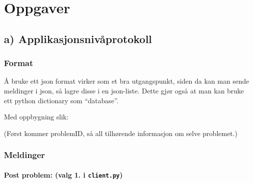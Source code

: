 \section{Oppgaver}\label{oppgaver}

\subsection{a)
Applikasjonsnivåprotokoll}\label{a-applikasjonsnivuxe5protokoll}

\subsubsection{Format}\label{format}

Å bruke ett json format virker som et bra utgangspunkt, siden da kan man
sende meldinger i json, så lagre disse i en json-liste. Dette gjør også
at man kan bruke ett python dictionary som ``database''.

Med oppbygning slik:

\begin{Shaded}
\begin{Highlighting}[]
\OperatorTok{=}\NormalTok{ \{}
    \NormalTok{ : \{}
    \NormalTok{: }\NormalTok{,}
    \NormalTok{: \{}
        \NormalTok{: }\NormalTok{, }\NormalTok{: }\NormalTok{, }\NormalTok{: }
\NormalTok{        \}}
\NormalTok{    \}  }
\NormalTok{\}}
\end{Highlighting}
\end{Shaded}

(Først kommer problemID, så all tilhørende informasjon om selve
problemet.)

\subsubsection{Meldinger}\label{meldinger}

\paragraph{\texorpdfstring{\textbf{Post problem: (valg 1. i
\texttt{client.py})}}{Post problem: (valg 1. i client.py)}}\label{post-problem-valg-1.-i-client.py}

